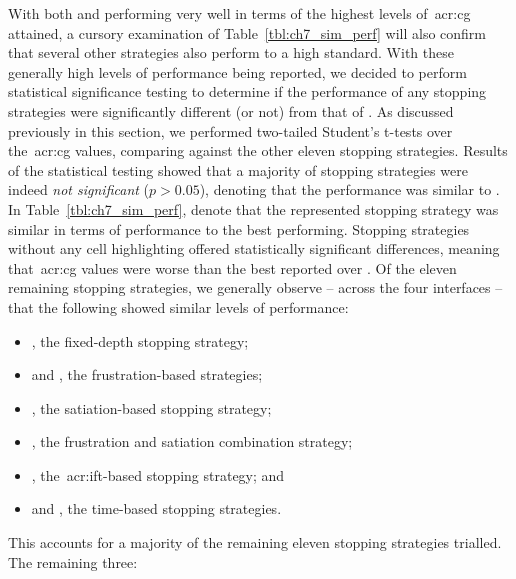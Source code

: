 With both  and  performing very well in terms of the highest levels of~\gls{acr:cg} attained, a cursory examination of Table~\ref{tbl:ch7_sim_perf} will also confirm that several other strategies also perform to a high standard. With these generally high levels of performance being reported, we decided to perform statistical significance testing to determine if the performance of any stopping strategies were significantly different (or not) from that of . As discussed previously in this section, we performed two-tailed Student's t-tests over the~\gls{acr:cg} values, comparing  against the other eleven stopping strategies. Results of the statistical testing showed that a majority of stopping strategies were indeed \emph{not significant} ($p>0.05$), denoting that the performance was similar to . In Table~\ref{tbl:ch7_sim_perf},  denote that the represented stopping strategy was similar in terms of performance to the best performing. Stopping strategies without any cell highlighting offered statistically significant differences, meaning that~\gls{acr:cg} values were worse than the best reported over . Of the eleven remaining stopping strategies, we generally observe -- across the four interfaces -- that the following showed similar levels of performance:

\vspace*{-2mm}
\begin{itemize}
    \item{, the fixed-depth stopping strategy;}
    \item{ and , the frustration-based strategies;}
    \item{, the satiation-based stopping strategy;}
    \item{, the frustration and satiation combination strategy;}
    \item{, the~\gls{acr:ift}-based stopping strategy; and}
    \item{ and , the time-based stopping strategies.}
\end{itemize}
\vspace*{-2mm}

This accounts for a majority of the remaining eleven stopping strategies trialled. The remaining three:

